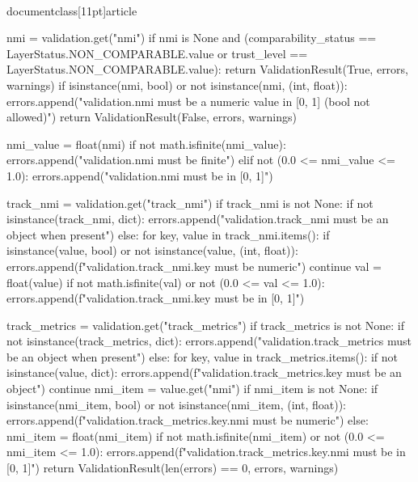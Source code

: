 \\documentclass[11pt]{article}
\begin{document}
\begin{CodeBlock}
    nmi = validation.get("nmi")
    if nmi is None and (comparability_status == LayerStatus.NON_COMPARABLE.value or trust_level == LayerStatus.NON_COMPARABLE.value):
        return ValidationResult(True, errors, warnings)
    if isinstance(nmi, bool) or not isinstance(nmi, (int, float)):
        errors.append("validation.nmi must be a numeric value in [0, 1] (bool not allowed)")
        return ValidationResult(False, errors, warnings)

    nmi_value = float(nmi)
    if not math.isfinite(nmi_value):
        errors.append("validation.nmi must be finite")
    elif not (0.0 <= nmi_value <= 1.0):
        errors.append("validation.nmi must be in [0, 1]")

    track_nmi = validation.get("track_nmi")
    if track_nmi is not None:
        if not isinstance(track_nmi, dict):
            errors.append("validation.track_nmi must be an object when present")
        else:
            for key, value in track_nmi.items():
                if isinstance(value, bool) or not isinstance(value, (int, float)):
                    errors.append(f"validation.track_nmi.{key} must be numeric")
                    continue
                val = float(value)
                if not math.isfinite(val) or not (0.0 <= val <= 1.0):
                    errors.append(f"validation.track_nmi.{key} must be in [0, 1]")

    track_metrics = validation.get("track_metrics")
    if track_metrics is not None:
        if not isinstance(track_metrics, dict):
            errors.append("validation.track_metrics must be an object when present")
        else:
            for key, value in track_metrics.items():
                if not isinstance(value, dict):
                    errors.append(f"validation.track_metrics.{key} must be an object")
                    continue
                nmi_item = value.get("nmi")
                if nmi_item is not None:
                    if isinstance(nmi_item, bool) or not isinstance(nmi_item, (int, float)):
                        errors.append(f"validation.track_metrics.{key}.nmi must be numeric")
                    else:
                        nmi_item = float(nmi_item)
                        if not math.isfinite(nmi_item) or not (0.0 <= nmi_item <= 1.0):
                            errors.append(f"validation.track_metrics.{key}.nmi must be in [0, 1]")
    return ValidationResult(len(errors) == 0, errors, warnings)



\end{CodeBlock}
\end{document}
